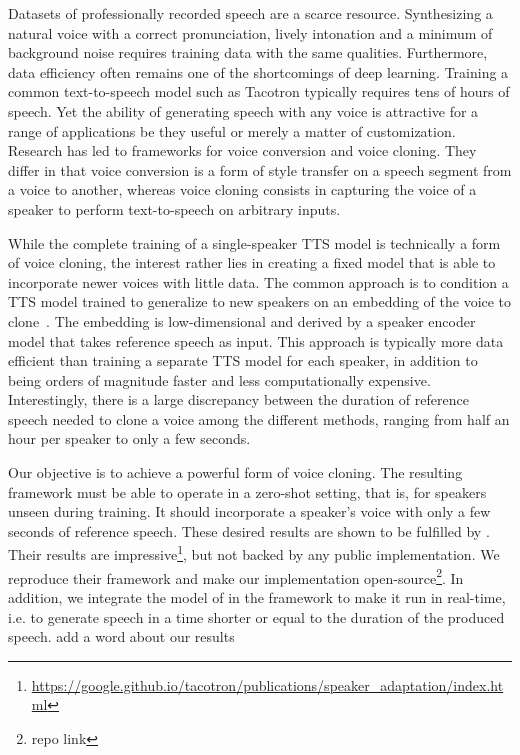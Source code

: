 \documentclass[a4paper, oneside, 12pt, english]{article}
\begin{document}
Datasets of professionally recorded speech are a scarce resource. Synthesizing a natural voice with a correct pronunciation, lively intonation and a minimum of background noise requires training data with the same qualities. Furthermore, data efficiency often remains one of the shortcomings of deep learning. Training a common text-to-speech model such as Tacotron \citep{Tacotron1} typically requires tens of hours of speech. %
Yet the ability of generating speech with any voice is attractive for a range of applications be they useful or merely a matter of customization. Research has led to frameworks for voice conversion and voice cloning. They differ in that voice conversion is a form of style transfer on a speech segment from a voice to another, whereas voice cloning consists in capturing the voice of a speaker to perform text-to-speech on arbitrary inputs. 

While the complete training of a single-speaker TTS model is technically a form of voice cloning, the interest rather lies in creating a fixed model that is able to incorporate newer voices with little data. The common approach is to condition a TTS model trained to generalize to new speakers on an embedding of the voice to clone~\citep{DeepVoice2, CloningFewSamples, SV2TTS}. The embedding is low-dimensional and derived by a speaker encoder model that takes reference speech as input. This approach is typically more data efficient than training a separate TTS model for each speaker, in addition to being orders of magnitude faster and less computationally expensive. Interestingly, there is a large discrepancy between the duration of reference speech needed to clone a voice among the different methods, ranging from half an hour per speaker to only a few seconds.

Our objective is to achieve a powerful form of voice cloning. The resulting framework must be able to operate in a zero-shot setting, that is, for speakers unseen during training. It should incorporate a speaker's voice with only a few seconds of reference speech. These desired results are shown to be fulfilled by \citep{SV2TTS}. Their results are impressive\footnote{\url{https://google.github.io/tacotron/publications/speaker_adaptation/index.html}}, but not backed by any public implementation. We reproduce their framework and make our implementation open-source\footnote{\color{red} repo link}. In addition, we integrate the model of \citep{EfficientNeuralAudioSynthesis} in the framework to make it run in real-time, i.e. to generate speech in a time shorter or equal to the duration of the produced speech. \color{red} add a word about our results \color{black}
\end{document}
